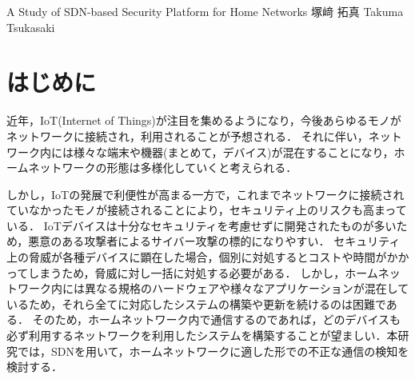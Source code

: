 \documentclass[a4paper,10pt,twocolumn,uplatex]{jsarticle}
\date{9}
\begin{document}
{A Study of SDN-based Security Platform for Home Networks}
{塚﨑 拓真}
{Takuma Tsukasaki}

\section{はじめに}
近年，IoT(Internet of Things)が注目を集めるようになり，今後あらゆるモノがネットワークに接続され，利用されることが予想される．
それに伴い，ネットワーク内には様々な端末や機器(まとめて，デバイス)が混在することになり，ホームネットワークの形態は多様化していくと考えられる．\par
しかし，IoTの発展で利便性が高まる一方で，これまでネットワークに接続されていなかったモノが接続されることにより，セキュリティ上のリスクも高まっている\cite{guideline}．
IoTデバイスは十分なセキュリティを考慮せずに開発されたものが多いため，悪意のある攻撃者によるサイバー攻撃の標的になりやすい．
セキュリティ上の脅威が各種デバイスに顕在した場合，個別に対処するとコストや時間がかかってしまうため，脅威に対し一括に対処する必要がある．
しかし，ホームネットワーク内には異なる規格のハードウェアや様々なアプリケーションが混在しているため，それら全てに対応したシステムの構築や更新を続けるのは困難である．
そのため，ホームネットワーク内で通信するのであれば，どのデバイスも必ず利用するネットワークを利用したシステムを構築することが望ましい．本研究では，SDNを用いて，ホームネットワークに適した形での不正な通信の検知を検討する．

\end{document}
